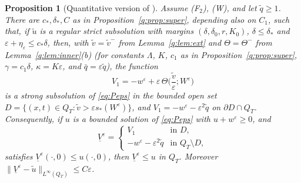 \documentclass[11pt]{amsart}
\newtheorem{proposition}[theorem]{Proposition}
\theoremstyle{definition}
\theoremstyle{remark}
\newcommand{\ve}{\varepsilon}
\begin{document}
\begin{proposition}[Quantitative version of {\cite[Theorem~4.2]{FernandezBonderWolanski2004}}]\label{q:prop:sub}
Assume (F$_2$), (W), and let $\tilde q\ge1$. There are $c_*,\delta_*,C$ as in
Proposition~\ref{q:prop:super}, depending also on $C_1$, such that, if $\tilde u$ is a
regular strict subsolution with margins $(\delta,\delta_0,r,K_0)$, $\delta\le\delta_*$ and
$\ve+\eta_\ve\le c_*\delta$, then, with $\tilde v=\tilde v^-$ from Lemma~\ref{q:lem:ext} and
$\Theta=\Theta^-$ from Lemma~\ref{q:lem:inner}(b) (for constants $\Lambda$, $K$, $c_1$ as in
Proposition~\ref{q:prop:super}, $\gamma=c_1\delta$,
$\kappa=K\ve$, and $\bar q=\ve\tilde q$), the function
\[
V_1=-w^\ve+\ve\,\Theta\Big(\frac{\tilde v}\ve;W^\ve\Big)
\]
is a strong subsolution of \eqref{eq:Peps} in the bounded open set
$D=\{(x,t)\in Q_T:\tilde v>\ve s_*(W^\ve)\}$, and $V_1=-w^\ve-\ve^2\tilde q$ on $\partial D\cap Q_T$.
Consequently, if $u$ is a bounded solution of \eqref{eq:Peps} with $u+w^\ve\ge0$, and
\[
\underline V^\ve=\begin{cases}V_1&\text{in }D,\\ -w^\ve-\ve^2\tilde q&\text{in }Q_T\setminus D,\end{cases}
\]
satisfies $\underline V^\ve(\cdot,0)\le u(\cdot,0)$, then $\underline V^\ve\le u$ in $Q_T$. Moreover
$\|\underline V^\ve-\tilde u\|_{L^\infty(Q_T)}\le C\ve$.
\end{proposition}
\end{document}
